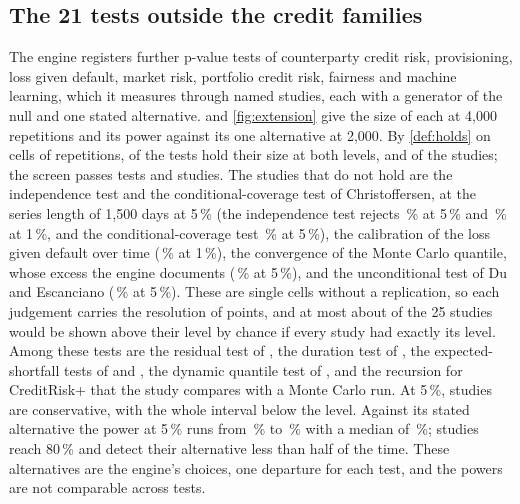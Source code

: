 \subsection{The 21 tests outside the credit families}
\label{sec:extension}

The engine registers \nExtTests{} further p-value tests of counterparty credit risk, provisioning, loss given default, market risk, portfolio credit risk, fairness and machine learning, which it measures through \nStudies{} named studies, each with a generator of the null and one stated alternative.
 and \cref{fig:extension} give the size of each at 4,000 repetitions and its power against its one alternative at 2,000.
By \cref{def:holds} on cells of \nNullReps{} repetitions, \nExtHold{} of the \nExtTests{} tests hold their size at both levels, and \nStudiesHold{} of the \nStudies{} studies; the screen passes \nExtHoldRule{} tests and \nStudiesHoldRule{} studies.
The \nStudiesNotHold{} studies that do not hold are the independence test and the conditional-coverage test of Christoffersen, at the series length of 1,500 days at 5\,\% (the independence test rejects \chrIndFive\,\% at 5\,\% and \chrIndOne\,\% at 1\,\%, and the conditional-coverage test \chrCcFive\,\% at 5\,\%), the calibration of the loss given default over time (\lgdTimeOne\,\% at 1\,\%), the convergence of the Monte Carlo quantile, whose excess the engine documents (\mcConvFive\,\% at 5\,\%), and the unconditional test of Du and Escanciano (\duUncondFive\,\% at 5\,\%).
These are single cells without a replication, so each judgement carries the resolution of \detIntFiveFour{} points, and at most about \expFalseAboveExt{} of the 25 studies would be shown above their level by chance if every study had exactly its level.
Among these tests are the residual test of \citet{mcneil2000}, the duration test of \citet{christoffersen2004}, the expected-shortfall tests of \citet{acerbi2014} and \citet{du2017}, the dynamic quantile test of \citet{engle2004}, and the recursion for CreditRisk+ \citep{haaf2004} that the study compares with a Monte Carlo run.
At 5\,\%, \nExtCons{} studies are conservative, with the whole interval below the level.
Against its stated alternative the power at 5\,\% runs from \extPowMin\,\% to \extPowMax\,\% with a median of \extPowMed\,\%; \extAboveBar{} studies reach 80\,\% and \extBelowHalf{} detect their alternative less than half of the time.
These alternatives are the engine's choices, one departure for each test, and the powers are not comparable across tests.

